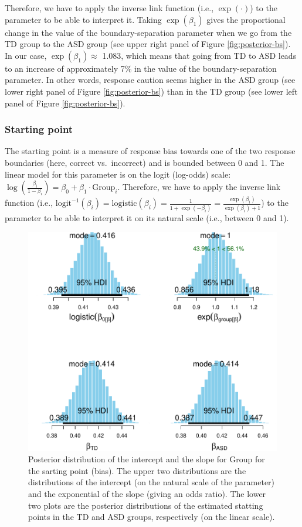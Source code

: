 \documentclass[
  11pt,
  english,
  ,doc,floatsintext]{apa6}
\begin{document}
Therefore, we have to apply the inverse link function (i.e., \(\exp(\cdot)\)) to the parameter to be able to interpret it. Taking \(\exp(\beta_{1})\) gives the proportional change in the value of the boundary-separation parameter when we go from the TD group to the ASD group (see upper right panel of Figure \ref{fig:posterior-bs}). In our case, \(\exp(\beta_{1}) \approx\) 1.083, which means that going from TD to ASD leads to an increase of approximately 7\% in the value of the boundary-separation parameter. In other words, response caution seems higher in the ASD group (see lower right panel of Figure \ref{fig:posterior-bs}) than in the TD group (see lower left panel of Figure \ref{fig:posterior-bs}).

\hypertarget{starting-point}{%
\subsubsection{Starting point}\label{starting-point}}

The starting point is a measure of response bias towards one of the two response boundaries (here, correct vs.~incorrect) and is bounded between 0 and 1. The linear model for this parameter is on the logit (log-odds) scale: \(\log(\frac{\beta_{i}}{1 - \beta_{i}}) = \beta_{0} + \beta_{1} \cdot \text{Group}_{i}\). Therefore, we have to apply the inverse link function (i.e., \(\mathrm{logit}^{-1}(\beta_{i}) = \mathrm{logistic}(\beta_{i}) = \frac{1}{1 + \exp(- \beta_{i})} = \frac{\exp(\beta_{i})}{\exp(\beta_{i}) + 1}\)) to the parameter to be able to interpret it on its natural scale (i.e., between 0 and 1).

\begin{figure}[!htb]

{\centering \includegraphics[width=0.75\linewidth]{supplementary_materials_files/figure-latex/posterior-bias-1} 

}

\caption{Posterior distribution of the intercept and the slope for Group for the sarting point (bias). The upper two distributions are the distributions of the intercept (on the natural scale of the parameter) and the exponential of the slope (giving an odds ratio). The lower two plots are the posterior distributions of the estimated statting points in the TD and ASD groups, respectively (on the linear scale).}\label{fig:posterior-bias}
\end{figure}
\end{document}
